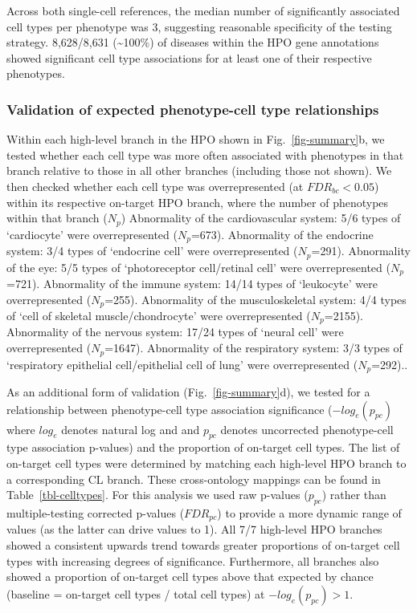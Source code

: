\documentclass[
]{agujournal2019}
\begin{document}
Across both single-cell references, the median number of significantly
associated cell types per phenotype was 3, suggesting reasonable
specificity of the testing strategy. 8,628/8,631 (\textasciitilde100\%)
of diseases within the HPO gene annotations showed significant cell type
associations for at least one of their respective phenotypes.

\subsubsection{Validation of expected phenotype-cell type
relationships}\label{validation-of-expected-phenotype-cell-type-relationships}

Within each high-level branch in the HPO shown in
Fig.~\ref{fig-summary}b, we tested whether each cell type was more often
associated with phenotypes in that branch relative to those in all other
branches (including those not shown). We then checked whether each cell
type was overrepresented (at \(FDR_{bc}<0.05\)) within its respective
on-target HPO branch, where the number of phenotypes within that branch
(\(N_{p}\)) Abnormality of the cardiovascular system: 5/6 types of
`cardiocyte' were overrepresented (\(N_{p}\)=673). Abnormality of the
endocrine system: 3/4 types of `endocrine cell' were overrepresented
(\(N_{p}\)=291). Abnormality of the eye: 5/5 types of `photoreceptor
cell/retinal cell' were overrepresented (\(N_{p}\)=721). Abnormality of
the immune system: 14/14 types of `leukocyte' were overrepresented
(\(N_{p}\)=255). Abnormality of the musculoskeletal system: 4/4 types of
`cell of skeletal muscle/chondrocyte' were overrepresented
(\(N_{p}\)=2155). Abnormality of the nervous system: 17/24 types of
`neural cell' were overrepresented (\(N_{p}\)=1647). Abnormality of the
respiratory system: 3/3 types of `respiratory epithelial cell/epithelial
cell of lung' were overrepresented (\(N_{p}\)=292)..

As an additional form of validation (Fig.~\ref{fig-summary}d), we tested
for a relationship between phenotype-cell type association significance
(\(-log_{e}(p_{pc})\) where \(log_{e}\) denotes natural log and and
\(p_{pc}\) denotes uncorrected phenotype-cell type association p-values)
and the proportion of on-target cell types. The list of on-target cell
types were determined by matching each high-level HPO branch to a
corresponding CL branch. These cross-ontology mappings can be found in
Table~\ref{tbl-celltypes}. For this analysis we used raw p-values
(\(p_{pc}\)) rather than multiple-testing corrected p-values
(\(FDR_{pc}\)) to provide a more dynamic range of values (as the latter
can drive values to 1). All 7/7 high-level HPO branches showed a
consistent upwards trend towards greater proportions of on-target cell
types with increasing degrees of significance. Furthermore, all branches
also showed a proportion of on-target cell types above that expected by
chance (baseline = on-target cell types / total cell types) at
\(-log_{e}(p_{pc})>1\).
\end{document}
